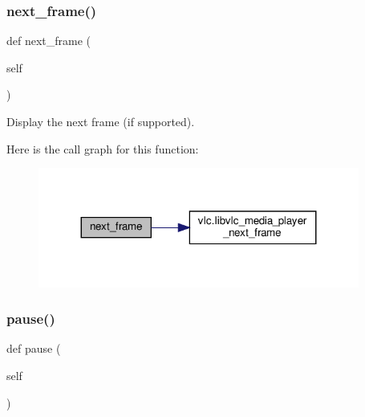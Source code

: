 \subsubsection{\texorpdfstring{next\+\_\+frame()}{next\_frame()}}
{\footnotesize\ttfamily def next\+\_\+frame (\begin{DoxyParamCaption}\item[{}]{self }\end{DoxyParamCaption})}

\begin{DoxyVerb}Display the next frame (if supported).
\end{DoxyVerb}
 Here is the call graph for this function\+:
\nopagebreak
\begin{figure}[H]
\begin{center}
\leavevmode
\includegraphics[width=299pt]{classvlc_1_1_media_player_a702101a1321786e2dab4c8a342b73ca0_cgraph}
\end{center}
\end{figure}
\mbox{\label{classvlc_1_1_media_player_aee7a4c35e3232c131ff62b5866eb4a16}} 
\subsubsection{\texorpdfstring{pause()}{pause()}}
{\footnotesize\ttfamily def pause (\begin{DoxyParamCaption}\item[{}]{self }\end{DoxyParamCaption})}

